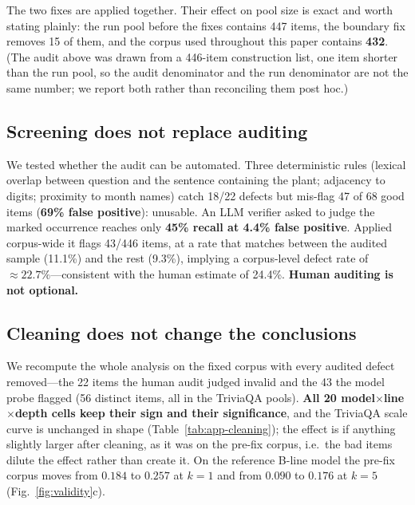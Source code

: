\documentclass[11pt]{article}
\begin{document}
The two fixes are applied together. Their effect on pool size is exact and worth stating
plainly: the run pool before the fixes contains 447 items, the boundary fix removes 15 of
them, and the corpus used throughout this paper contains \textbf{432}. (The audit above was
drawn from a 446-item construction list, one item shorter than the run pool, so the audit
denominator and the run denominator are not the same number; we report both rather than
reconciling them post hoc.)

\subsection{Screening does not replace auditing}
We tested whether the audit can be automated. Three deterministic rules (lexical overlap
between question and the sentence containing the plant; adjacency to digits; proximity to
month names) catch 18/22 defects but mis-flag 47 of 68 good items (\textbf{69\% false
positive}): unusable. An LLM verifier asked to judge the marked occurrence reaches only
\textbf{45\% recall at 4.4\% false positive}. Applied corpus-wide it flags 43/446 items,
at a rate that matches between the audited sample (11.1\%) and the rest (9.3\%), implying a
corpus-level defect rate of $\approx 22.7\%$---consistent with the human estimate of
24.4\%. \textbf{Human auditing is not optional.}

\subsection{Cleaning does not change the conclusions}
We recompute the whole analysis on the fixed corpus with every audited defect removed---the
22 items the human audit judged invalid and the 43 the model probe flagged (56 distinct
items, all in the TriviaQA pools). \textbf{All 20 model$\times$line$\times$depth cells keep
their sign and their significance}, and the TriviaQA scale curve is unchanged in shape
(Table~\ref{tab:app-cleaning}); the effect is if anything slightly larger after cleaning, as
it was on the pre-fix corpus, i.e.\ the bad items dilute the effect rather than create it.
On the reference B-line model the pre-fix corpus moves from $0.184$ to $0.257$ at $k{=}1$
and from $0.090$ to $0.176$ at $k{=}5$ (Fig.~\ref{fig:validity}c).
\end{document}
